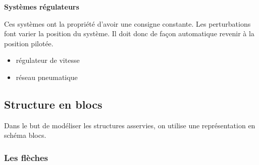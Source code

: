 \documentclass[10pt,fleqn]{article} %
\begin{document}
\begin{defi}
\textbf{Systèmes régulateurs}

Ces systèmes ont la propriété d'avoir une consigne constante. Les perturbations font varier la position du système. Il doit donc de façon automatique revenir à la position pilotée.
\end{defi}

\begin{exemple}
 \begin{itemize}
\item régulateur de vitesse
\item réseau pneumatique
\end{itemize}
\end{exemple}

\subsection{Structure en blocs}
Dans le but de modéliser les structures asservies, on utilise une représentation en schéma blocs.

\subsubsection*{Les flèches}
\end{document}

